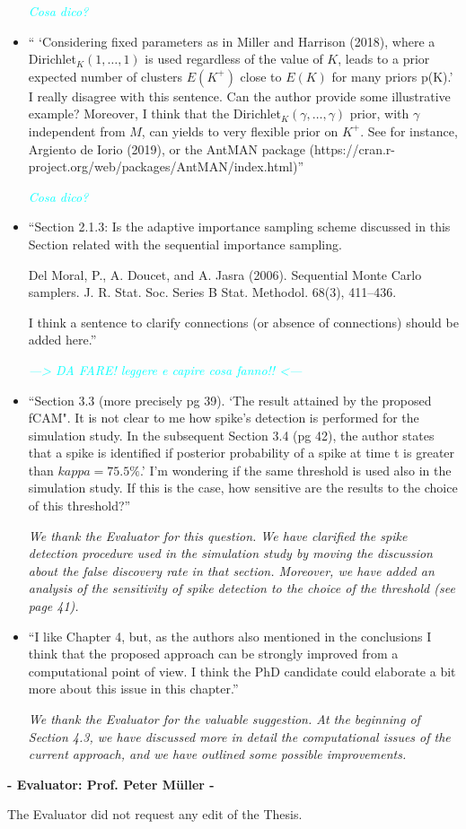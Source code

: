 \documentclass[11pt]{letter}
\begin{document}
\begin{itemize}
{\em 
	\textcolor{cyan}{Cosa dico?}
}
\vskip3mm

%
\item `` `Considering fixed parameters as in Miller and Harrison (2018), where a Dirichlet$_K(1,\dots, 1)$ is used regardless of the value of $K$, leads to a prior expected number of clusters $E(K^+)$ close to $E(K)$ for many priors p(K).'\\
I really disagree with this sentence. Can the author provide some illustrative example? Moreover, I think that the Dirichlet$_K(\gamma,\dots, \gamma)$ prior, with $\gamma$ independent from $M$, can yields to very flexible prior on $K^+$. See for instance, Argiento de Iorio (2019), or the AntMAN package (https://cran.r-
project.org/web/packages/AntMAN/index.html)''\vskip1mm

{\em 
	\textcolor{cyan}{Cosa dico?}
}
\vskip3mm

%
\item ``Section 2.1.3:
Is the adaptive importance sampling scheme discussed in this Section related with the sequential importance
sampling.

Del Moral, P., A. Doucet, and A. Jasra (2006). Sequential Monte Carlo samplers. J. R. Stat. Soc. Series B Stat. Methodol. 68(3), 411–436.

I think a sentence to clarify connections (or absence of connections) should be added here.''\vskip1mm

{\em 
	\textcolor{cyan}{---> DA FARE! leggere e capire cosa fanno!! <---}
}
\vskip3mm

%
\item ``Section 3.3 (more precisely pg 39). `The result attained by the proposed fCAM".
It is not clear to me how spike's detection is performed for the simulation study. In the subsequent Section 3.4 (pg 42), the author states that a spike is identified if posterior probability of a spike at time t is greater than $kappa=75.5\%$.'
I'm wondering if the same threshold is used also in the simulation study. If this is the case, how sensitive are the results to the choice of this threshold?''\vskip1mm

{\em 
	We thank the Evaluator for this question. We have clarified the spike detection procedure used in the simulation study by moving the discussion about the false discovery rate in that section. Moreover, we have added an analysis of the sensitivity of spike detection to the choice of the threshold (see page 41).
}
\vskip3mm

%
\item ``I like Chapter 4, but, as the authors also mentioned in the conclusions I think that the proposed approach can be strongly improved from a computational point of view. I think the PhD candidate could elaborate a bit more about this issue in this chapter.''\vskip1mm

{\em 
	We thank the Evaluator for the valuable suggestion. At the beginning of Section 4.3, we have discussed more in detail the computational issues of the current approach, and we have outlined some possible improvements.
}
\vskip3mm



\end{itemize}
\vskip10mm
\begin{center}
{\large\bf - Evaluator: Prof. Peter M\"uller -}
\end{center}

The Evaluator did not request any edit of the Thesis.

%
\end{document}
